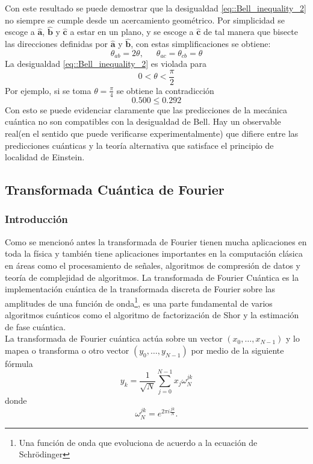 \documentclass[a4paper]{article}
\begin{document}
Con este resultado se puede demostrar que la desigualdad \ref{eq::Bell_inequality_2} no siempre se cumple desde un acercamiento geométrico. Por simplicidad se escoge a $\mathbf{\hat{a}}$, $\mathbf{\hat{b}}$ y $\mathbf{\hat{c}}$ a estar en un plano, y se escoge a $\mathbf{\hat{c}}$ de tal manera que bisecte las direcciones definidas por $\mathbf{\hat{a}}$ y $\mathbf{\hat{b}}$, con estas simplificaciones se obtiene:
\begin{equation}
\theta_{ab}=2\theta,\,\,\,\,\,\,\,\,\, \theta_{ac}=\theta_{cb}=\theta
\end{equation}
La desigualdad \ref{eq::Bell_inequality_2} es violada para
\begin{equation}
0<\theta<\frac{\pi}{2}
\end{equation}
Por ejemplo, si se toma $\theta=\frac{\pi}{4}$ se obtiene la contradicción
\begin{equation}
0.500\leq 0.292
\end{equation}
Con esto se puede evidenciar claramente que las predicciones de la mecánica cuántica no son compatibles con la desigualdad de Bell. Hay un observable real(en el sentido que puede verificarse experimentalmente) que difiere entre las predicciones cuánticas y la teoría alternativa que satisface el principio de localidad de Einstein.


\subsection{Transformada Cuántica de Fourier}
\subsubsection{Introducción}
Como se mencionó antes la transformada de Fourier tienen mucha aplicaciones en toda la física y también tiene aplicaciones importantes en la computación clásica en áreas como el procesamiento de señales, algoritmos de compresión de datos y teoría de complejidad de algoritmos. La transformada de Fourier Cuántica es la implementación cuántica de la transformada discreta de Fourier sobre las amplitudes de una función de onda\footnote{Una función de onda que evoluciona de acuerdo a la ecuación de Schr\"{o}dinger}, es una parte fundamental de varios algoritmos cuánticos  como el algoritmo de factorización de Shor y la estimación de fase cuántica.\\
La transformada de Fourier cuántica actúa sobre un vector $(x_0, \hdots, x_{N-1})$ y lo mapea o transforma o otro vector
$(y_0, \hdots, y_{N-1})$ por medio de la siguiente fórmula
\begin{equation}
y_{k}=\frac{1}{\sqrt{N}}\sum_{j=0}^{N-1}x_j \omega_{N}^{jk}
\end{equation}
donde 
\begin{equation}\label{eq::omega_definition}
\omega_{N}^{jk}=e^{2\pi i \frac{jk}{N}}.
\end{equation}
\end{document}
